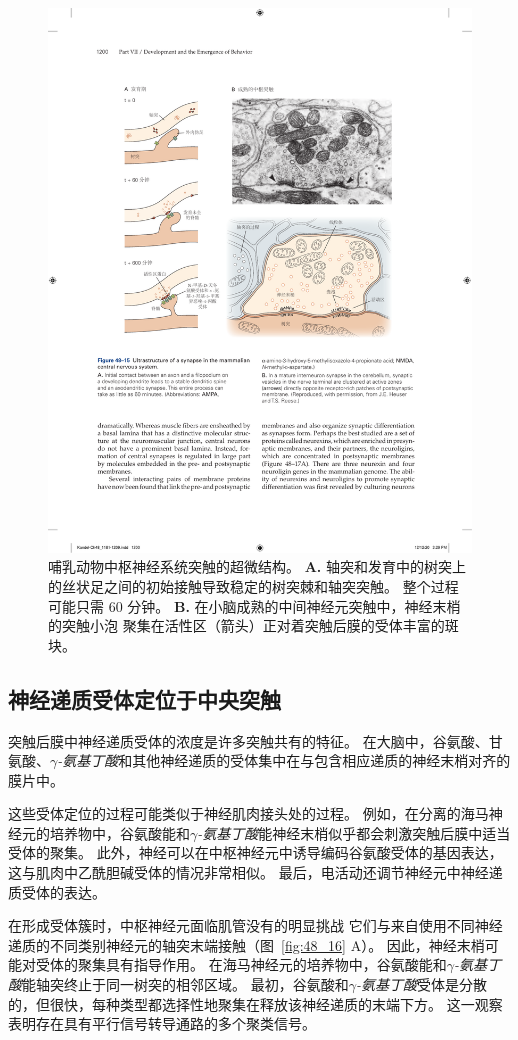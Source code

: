 \begin{figure}[htbp]
	\centering
	\includegraphics[width=0.75\linewidth]{chap48/fig_48_15}
	\caption{哺乳动物中枢神经系统突触的超微结构。
		\textbf{A.} 轴突和发育中的树突上的丝状足之间的初始接触导致稳定的树突棘和轴突突触。
		整个过程可能只需 60 分钟。
		\textbf{B.} 在小脑成熟的中间神经元突触中，神经末梢的突触小泡 聚集在活性区（箭头）正对着突触后膜的受体丰富的斑块。}
	\label{fig:48_15}
\end{figure}



\subsection{神经递质受体定位于中央突触}

突触后膜中神经递质受体的浓度是许多突触共有的特征。
在大脑中，谷氨酸、甘氨酸、\textit{$ \gamma $-氨基丁酸}和其他神经递质的受体集中在与包含相应递质的神经末梢对齐的膜片中。


这些受体定位的过程可能类似于神经肌肉接头处的过程。
例如，在分离的海马神经元的培养物中，谷氨酸能和\textit{$ \gamma $-氨基丁酸}能神经末梢似乎都会刺激突触后膜中适当受体的聚集。
此外，神经可以在中枢神经元中诱导编码谷氨酸受体的基因表达，这与肌肉中乙酰胆碱受体的情况非常相似。
最后，电活动还调节神经元中神经递质受体的表达。


在形成受体簇时，中枢神经元面临肌管没有的明显挑战
它们与来自使用不同神经递质的不同类别神经元的轴突末端接触（图~\ref{fig:48_16} A）。
因此，神经末梢可能对受体的聚集具有指导作用。
在海马神经元的培养物中，谷氨酸能和\textit{$ \gamma $-氨基丁酸}能轴突终止于同一树突的相邻区域。
最初，谷氨酸和\textit{$ \gamma $-氨基丁酸}受体是分散的，但很快，每种类型都选择性地聚集在释放该神经递质的末端下方。
这一观察表明存在具有平行信号转导通路的多个聚类信号。


